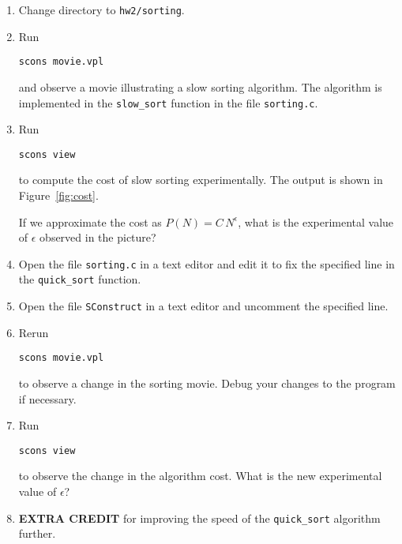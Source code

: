 \begin{enumerate}          
\item Change directory to \texttt{hw2/sorting}.
\item Run
\begin{verbatim}
scons movie.vpl
\end{verbatim}
and observe a movie illustrating a slow sorting algorithm. The
algorithm is implemented in the \texttt{slow\_sort} function in the
file \texttt{sorting.c}.

\item Run
\begin{verbatim}
scons view
\end{verbatim}
to compute the cost of slow sorting experimentally. The output is
shown in Figure~\ref{fig:cost}.


If we approximate the cost as $P(N)=C\,N^\epsilon$, what is the
experimental value of $\epsilon$ observed in the picture?

\item Open the file \texttt{sorting.c} in a text editor and edit it to 
fix the specified line in the \texttt{quick\_sort} function.

\item Open the file \texttt{SConstruct} in a text editor and uncomment 
      the specified line.

\item Rerun
\begin{verbatim}
scons movie.vpl
\end{verbatim}
to observe a change in the sorting movie. Debug your changes to the
program if necessary.

\item Run
\begin{verbatim}
scons view
\end{verbatim}
to observe the change in the algorithm cost. What is the new
experimental value of $\epsilon$?

\item \textbf{EXTRA CREDIT} for improving the speed of the 
\texttt{quick\_sort} algorithm further.
\end{enumerate}

\lstset{language=c,numbers=left,numberstyle=\tiny,showstringspaces=false}


